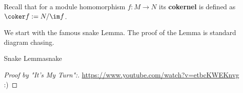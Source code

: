 \documentclass[twoside = false,	%
		headsepline,		%
		parskip = true,
		]{scrbook}						%
\begin{document}
    Recall that for a module homomorphism $f: M \to N$ its \textbf{cokernel} is defined as $\coker f := N/\im f$.

    We start with the famous snake Lemma. The proof of the Lemma is standard diagram chasing.

    \begin{lemma}{Snake Lemma}{snake}
        
    \end{lemma}

    \begin{proof}[Proof by "It's My Turn":]
        \url{https://www.youtube.com/watch?v=etbcKWEKnvg} :)
    \end{proof}
    
\printbibliography
\end{document}
